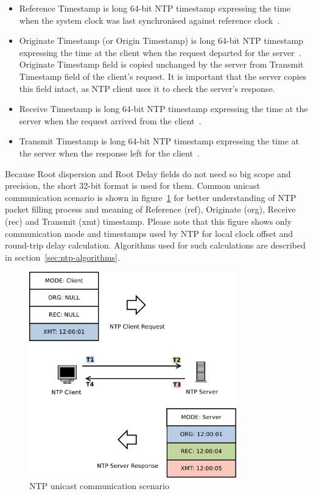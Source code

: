 \begin{itemize}
to increase its polling interval.
For stratum 1, this is a four-octet, left-justified, zero-padded ASCII
string assigned to the reference clock (e.g. "GPS" when synchronising against Global Position System clock).
Above stratum 1, this is the reference identifier of the server used for synchronisation
and can be used by client together with stratum field to detect loops in NTP hierarchy.
If communicating over IPv4, the identifier is IPv4 address.
If communicating over IPv6, it is the first four octets of the MD5 hash of the IPv6 address~\cite{rfc5905}.
\item
Reference Timestamp is long 64-bit NTP timestamp expressing the time
when the system clock was last synchronised against reference clock~\cite{rfc5905}.
\item
Originate Timestamp (or Origin Timestamp) is long 64-bit NTP timestamp expressing the time
at the client when the request departed for the server~\cite{rfc5905}.
Originate Timestamp field is copied
unchanged by the server from Transmit Timestamp field of the client's request.
It is important that the server copies this field intact,
as NTP client uses it to check the server's response.
\item
Receive Timestamp is long 64-bit NTP timestamp expressing the time
at the server when the request arrived from the client~\cite{rfc5905}.
\item
Transmit Timestamp is long 64-bit NTP timestamp expressing the time
at the server when the response left for the client~\cite{rfc5905}.
\end{itemize}

Because Root dispersion and Root Delay fields do not need so big scope and precision,
the short 32-bit format is used for them.
Common unicast communication scenario is shown in figure~\ref{fig:ntp-client-server}
for better understanding of NTP packet filling process and meaning of
Reference (ref), Originate (org), Receive (rec) and Transmit (xmt) timestamp.
Please note that this figure shows only communication mode and
timestamps used by NTP for local clock offset and round-trip delay calculation.
Algorithms used for such calculations are described in section~\ref{sec:ntp-algorithms}.

\begin{figure}
	\centering
	\includegraphics[width=9cm,keepaspectratio]{fig/ntp-client-server.pdf}
	\caption{NTP unicast communication scenario}
	\label{fig:ntp-client-server}
\end{figure}
